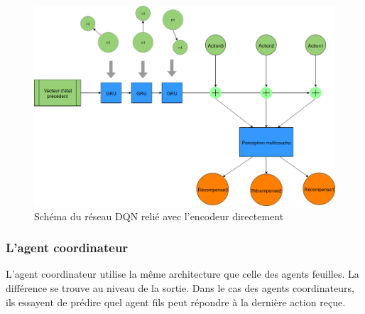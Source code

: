 \begin{figure}[H] 
	\centering
	\includegraphics[width=0.88\linewidth]{images/Conception/DM/encoder_dqn.png}
	\caption{Schéma du réseau DQN relié avec l'encodeur directement}
\end{figure}\label{encoder_dqn}
\subsubsection*{L'agent coordinateur}
L'agent coordinateur utilise la même architecture que celle des agents feuilles. La différence se trouve au niveau de la sortie. Dans le cas des agents coordinateurs, ils essayent de prédire quel agent fils peut répondre à la dernière action reçue.
